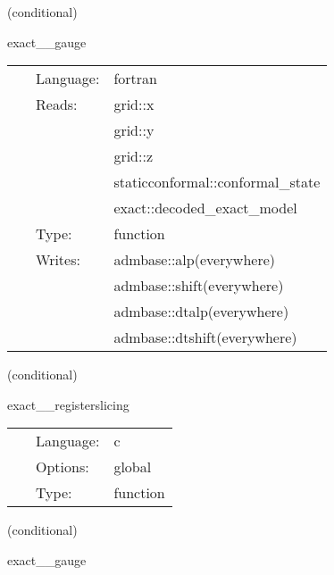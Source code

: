 \vspace{5mm}

   (conditional) 

\hspace{5mm} exact\_\_gauge 

\hspace{5mm}{\it set initial lapse and/or shift from exact solution on a trivial slice } 


\hspace{5mm}

 \begin{tabular*}{160mm}{cll} 
~ & Language:  & fortran \\ 
~ & Reads:  & grid::x \\ 
~& ~ &grid::y\\ 
~& ~ &grid::z\\ 
~& ~ &staticconformal::conformal\_state\\ 
~& ~ &exact::decoded\_exact\_model\\ 
~ & Type:  & function \\ 
~ & Writes:  & admbase::alp(everywhere) \\ 
~& ~ &admbase::shift(everywhere)\\ 
~& ~ &admbase::dtalp(everywhere)\\ 
~& ~ &admbase::dtshift(everywhere)\\ 
\end{tabular*} 


\vspace{5mm}

   (conditional) 

\hspace{5mm} exact\_\_registerslicing 

\hspace{5mm}{\it register slicings } 


\hspace{5mm}

 \begin{tabular*}{160mm}{cll} 
~ & Language:  & c \\ 
~ & Options:  & global \\ 
~ & Type:  & function \\ 
\end{tabular*} 


\vspace{5mm}

   (conditional) 

\hspace{5mm} exact\_\_gauge 

